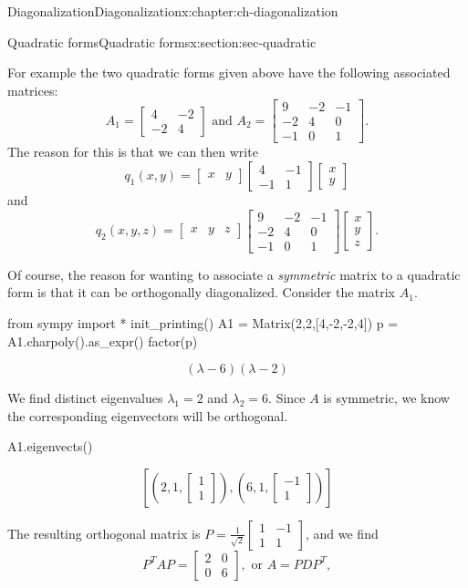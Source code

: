 \documentclass[oneside,10pt,]{book}
\numberwithin{equation}{section}
\newcommand{\bbm}{\begin{bmatrix}}
\newcommand{\ebm}{\end{bmatrix}}
\newcommand{\amp}{&}
\begin{document}
\begin{chapterptx}{Diagonalization}{}{Diagonalization}{}{}{x:chapter:ch-diagonalization}
\begin{sectionptx}{Quadratic forms}{}{Quadratic forms}{}{}{x:section:sec-quadratic}
\par
For example the two quadratic forms given above have the following associated matrices:%
\begin{equation*}
A_1 = \bbm 4 \amp -2\\-2\amp 4\ebm \text{ and } A_2 = \bbm 9 \amp -2 \amp -1\\-2\amp 4\amp 0\\-1\amp 0\amp 1\ebm\text{.}
\end{equation*}
The reason for this is that we can then write%
\begin{equation*}
q_1(x,y)=\bbm x\amp y\ebm\bbm 4 \amp -1\\-1\amp 1\ebm\bbm x\\y\ebm
\end{equation*}
and%
\begin{equation*}
q_2(x,y,z)=\bbm x\amp y\amp z\ebm\bbm 9 \amp -2 \amp -1\\-2\amp 4\amp 0\\-1\amp 0\amp 1\ebm\bbm x\\y\\z\ebm\text{.}
\end{equation*}
%
\par
Of course, the reason for wanting to associate a \emph{symmetric} matrix to a quadratic form is that it can be orthogonally diagonalized. Consider the matrix \(A_1\).%
\begin{sageinput}
from sympy import *
init_printing()
A1 = Matrix(2,2,[4,-2,-2,4])
p = A1.charpoly().as_expr()
factor(p)
\end{sageinput}
\begin{sageoutput}
\[(\lambda-6)(\lambda-2)\]
\end{sageoutput}
We find distinct eigenvalues \(\lambda_1=2\) and \(\lambda_2=6\). Since \(A\) is symmetric, we know the corresponding eigenvectors will be orthogonal.%
\begin{sageinput}
A1.eigenvects()
\end{sageinput}
\begin{sageoutput}
\[\left[\left(2,1,\bbm 1\\1\ebm\right),\left(6,1,\bbm -1\\1\ebm\right)\right]\]
\end{sageoutput}
The resulting orthogonal matrix is \(P=\frac{1}{\sqrt{2}}\bbm 1\amp -1\\1\amp 1\ebm\), and we find%
\begin{equation*}
P^TAP = \bbm 2\amp 0\\0\amp 6\ebm, \text{ or } A = PDP^T,

\end{equation*}
\end{sectionptx}
\end{chapterptx}
\end{document}
